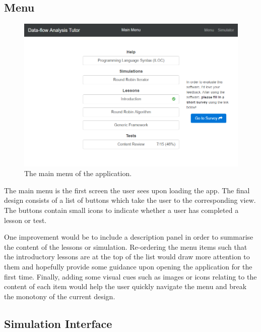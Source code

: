 \documentclass[bsc,twoside,singlespacing,parskip,logo,notimes,normalheadings]{infthesis}
\begin{document}
        \subsection{Menu}

        \begin{figure}[!ht]
          \centering
          \includegraphics[width=\textwidth, trim=0 0 0 0]{img/menu.png}
          \captionsetup{width=\textwidth, justification=centering}
          \caption{The main menu of the application.}\label{fig:menus}
        \end{figure}

        The main menu is the first screen the user sees upon loading
        the app. The final design consists of a list of buttons which
        take the user to the corresponding view. The buttons contain
        small icons to indicate whether a user has completed a lesson
        or test.

        One improvement would be to include a description panel in
        order to summarise the content of the lessons or
        simulation. Re-ordering the menu items such that the
        introductory lessons are at the top of the list would draw
        more attention to them and hopefully provide some guidance
        upon opening the application for the first time. Finally,
        adding some visual cues such as images or icons relating to
        the content of each item would help the user quickly navigate
        the menu and break the monotony of the current design.

        \subsection{Simulation Interface}
\end{document}
